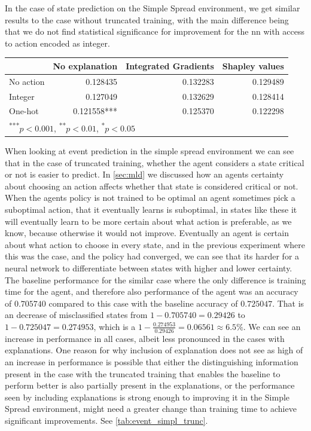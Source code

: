 \documentclass[UKenglish]{uiomasterthesis}
\begin{document}
In the case of state prediction on the Simple Spread environment, we get similar results to the case without truncated training, with the main difference being that we do not find statistical significance for improvement for the \ac{nn} with access to action encoded as integer.

\begin{center}
\label{tab:state_simpl_trunc}
\begin{tabular}{lrrr}
\toprule
& No explanation & Integrated Gradients & Shapley values \\
\midrule
No action & 0.128435 & 0.132283 & 0.129489 \\
Integer & 0.127049 & 0.132629 & 0.128414 \\
One-hot & 0.121558*** & 0.125370 & 0.122298 \\
\bottomrule
\multicolumn{3}{l}{\textsuperscript{***}$p<0.001$, 
  \textsuperscript{**}$p<0.01$, 
  \textsuperscript{*}$p<0.05$}
\end{tabular}
\end{center}


When looking at event prediction in the simple spread environment we can see that in the case of truncated training, whether the agent considers a state critical or not is easier to predict. In \cref{sec:mld} we discussed how an agents certainty about choosing an action affects whether that state is considered critical or not. When the agents policy is not trained to be optimal an agent sometimes pick a suboptimal action, that it eventually learns is suboptimal, in states like these it will eventually learn to be more certain about what action is preferable, as we know, because otherwise it would not improve. Eventually an agent is certain about what action to choose in every state, and in the previous experiment where this was the case, and the policy had converged, we can see that its harder for a neural network to differentiate between states with higher and lower certainty. The baseline performance for the similar case where the only difference is training time for the agent, and therefore also performance of the agent was an accuracy of $0.705740$ compared to this case with the baseline accuracy of $0.725047$. That is an decrease of misclassified states from $1-0.705740 = 0.29426$ to $1-0.725047 = 0.274953$, which is a $1-\frac{0.274953}{0.29426}=0.06561\approx 6.5\%$. We can see an increase in performance in all cases, albeit less pronounced in the cases with explanations. One reason for why inclusion of explanation does not see as high of an increase in performance is possible that either the distinguishing information present in the case with the truncated training that enables the baseline to perform better is also partially present in the explanations, or the performance seen by including explanations is strong enough to improving it in the Simple Spread environment, might need a greater change than training time to achieve significant improvements. See \cref{tab:event_simpl_trunc}.
\end{document}
